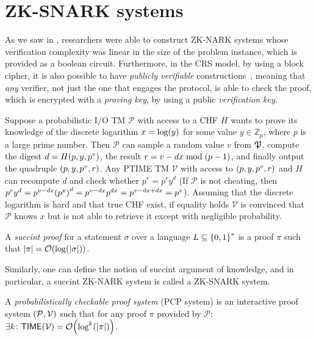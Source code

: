 \section{ZK-SNARK systems}\label{sec:zk-snark}
As we saw in , researchers were able to construct ZK-NARK systems whose 
verification complexity was linear in the size of the problem instance, which is provided as a 
boolean circuit.
Furthermore, in the CRS model, by using a block cipher, it is also possible to have 
\emph{publicly verifiable} constructions~\cite{LapidotS1991}, meaning that \emph{any} verifier, 
not just the one that engages the protocol, is able to check the proof, which is encrypted with a 
\emph{proving key}, by using a public \emph{verification key}.

\begin{proposition}
  Suppose a probabilistic I/O TM \(\mathcal{P}\) with access to a CHF \(H\) wants to prove its 
  knowledge of the discrete logarithm \(x = \call{\log}{y}\) for some value 
  \(y \in \mathbb{Z}_p\), where \(p\) is a large prime number.
  Then \(\mathcal{P}\) can sample a random value \(v\) from \(\Taperand \), compute the digest 
  \(d = \call{H}{p, y, p^v}\), the result \(r = {v - dx} \bmod \Parens*{p - 1}\), and finally 
  output the quadruple \(\Tuple{p, y, p^v, r}\).
  Any \textnormal{\textsc{PTIME}} TM \(\mathcal{V}\) with access to \(\Tuple{p, y, p^v, r}\) 
  and \(H\) can recompute \(d\) and check whether \(p^v = p^{r}y^{d}\)
  (If \(\mathcal{P}\) is not cheating, then \(p^{r}y^{d} = p^{v - dx}\Parens*{p^{x}}^d = 
  p^{v - dx}p^{dx} = p^{v - dx + dx} = p^v\)).
  Assuming that the discrete logarithm is hard and that true CHF exist, if equality holds 
  \(\mathcal{V}\) is convinced that \(\mathcal{P}\) knows \(x\) but is not able to retrieve it 
  except with negligible probability.
\end{proposition}

\begin{definition}
  A \emph{succint proof} for a statement \(\sigma \) over a language \(L \subseteq \Set{0, 1}^*\) 
  is a proof \(\pi \) such that \(\abs{\pi} = \BigO{\call{\log}{\abs{\sigma}}}\).
\end{definition}

Similarly, one can define the notion of succint argument of knowledge, and in particular, a 
succint ZK-NARK system is called a ZK-SNARK system.
\begin{definition}
  A \emph{probabilistically checkable proof system} (PCP system) is an interactive proof system 
  \(\Tuple{\mathcal{P, V}}\) such that for any proof \(\pi \) provided by \(\mathcal{P}\):
  \(\exists k\colon \call{\Time}{\mathcal{V}} = \BigO{\call{\log^k}{\abs{\pi}}}\).
\end{definition}

